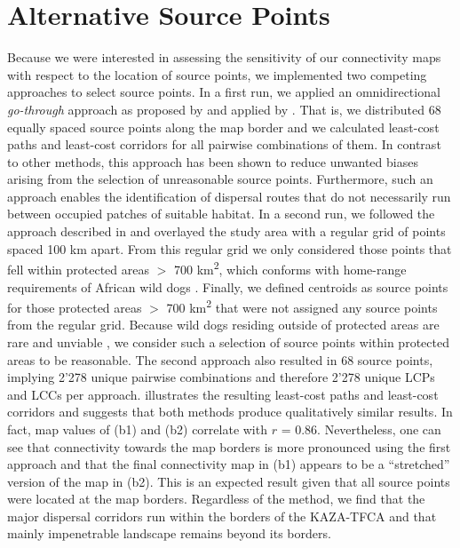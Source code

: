 \documentclass[abstract=off,10pt,a4paper,bibliography=totocnumbered]{article}
\begin{document}
\newpage
\section{Alternative Source Points}
Because we were interested in assessing the sensitivity of our connectivity maps
with respect to the location of source points, we implemented two competing
approaches to select source points. In a first run, we applied an
omnidirectional \textit{go-through} approach as proposed by \cite{Koen.2014} and
applied by \cite{Pitman.2017}. That is, we distributed 68 equally spaced source
points along the map border and we calculated least-cost paths and least-cost
corridors for all pairwise combinations of them. In contrast to other methods,
this approach has been shown to reduce unwanted biases arising from the
selection of unreasonable source points. Furthermore, such an approach enables
the identification of dispersal routes that do not necessarily run between
occupied patches of suitable habitat. In a second run, we followed the approach
described in \cite{Elliot.2014} and overlayed the study area with a regular grid
of points spaced 100 km apart. From this regular grid we only considered those
points that fell within protected areas \(>\) 700 km\textsuperscript{2}, which
conforms with home-range requirements of African wild dogs \citep{Pomilia.2015}.
Finally, we defined centroids as source points for those protected areas \(>\)
700 km\textsuperscript{2} that were not assigned any source points from the
regular grid. Because wild dogs residing outside of protected areas are rare and
unviable \citep{VanDerMeer.2014}, we consider such a selection of source points
within protected areas to be reasonable. The second approach also resulted in 68
source points, implying 2'278 unique pairwise combinations and therefore 2'278
unique LCPs and LCCs per approach.  illustrates
the resulting least-cost paths and least-cost corridors and suggests that both
methods produce qualitatively similar results. In fact, map values of
 (b1) and (b2) correlate with \(r\) = 0.86.
Nevertheless, one can see that connectivity towards the map borders is more
pronounced using the first approach and that the final connectivity map in (b1)
appears to be a  ``stretched'' version of the map in (b2). This is an expected
result given that all source points were located at the map borders. Regardless
of the method, we find that the major dispersal corridors run within the borders
of the KAZA-TFCA and that mainly impenetrable landscape remains beyond its
borders.
\end{document}
